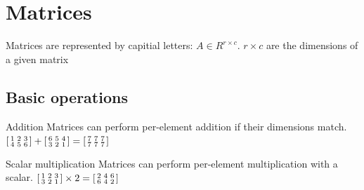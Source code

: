 \documentclass{article}
\begin{document}



\section{Matrices}
Matrices are represented
by capitial letters: $A\in R^{r\times c}$.
$r \times c$ are the dimensions of a given matrix

\subsection{Basic operations}
\begin{knBox}[]{Addition}
    Matrices can perform per-element addition if their dimensions match.
    \tcblower
    $\begin{bsmallmatrix}
            1 & 2 & 3\\
            4 & 5 & 6
        \end{bsmallmatrix} + \begin{bsmallmatrix}
            6 & 5 & 4\\
            3 & 2 & 1
        \end{bsmallmatrix} = \begin{bsmallmatrix}
            7 & 7 & 7\\7 & 7 & 7
        \end{bsmallmatrix}
    $
\end{knBox}
\begin{knBox}[]{Scalar multiplication}
    Matrices can perform per-element multiplication with a scalar.
    \tcblower
    $\begin{bsmallmatrix}
            1 & 2 & 3\\3 & 2 & 1
        \end{bsmallmatrix} \times 2 = \begin{bsmallmatrix}
            2 & 4 & 6\\6 & 4 & 2
        \end{bsmallmatrix}$
\end{knBox}
\end{document}
